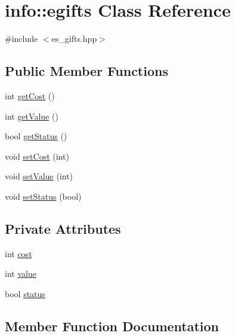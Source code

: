 \hypertarget{classinfo_1_1egifts}{}\section{info\+:\+:egifts Class Reference}
\label{classinfo_1_1egifts}


{\ttfamily \#include $<$es\+\_\+gifts.\+hpp$>$}

\subsection*{Public Member Functions}
\begin{DoxyCompactItemize}
\item 
int \hyperlink{classinfo_1_1egifts_a7f9d71b56a47b03952cf029cdc623296}{get\+Cost} ()
\item 
int \hyperlink{classinfo_1_1egifts_a3e9a4718f08ee328a6792895b3617366}{get\+Value} ()
\item 
bool \hyperlink{classinfo_1_1egifts_ad890793e5630b1f267aaf3e3ff78b0e3}{get\+Status} ()
\item 
void \hyperlink{classinfo_1_1egifts_a516d5d969afa4815ee5cf54aa46e6ba7}{set\+Cost} (int)
\item 
void \hyperlink{classinfo_1_1egifts_a7cd21e71685d65b50df0393dd5d6c4cb}{set\+Value} (int)
\item 
void \hyperlink{classinfo_1_1egifts_a5e9efe68c2fd27638b06f5b238107bf0}{set\+Status} (bool)
\end{DoxyCompactItemize}
\subsection*{Private Attributes}
\begin{DoxyCompactItemize}
\item 
int \hyperlink{classinfo_1_1egifts_aa6f498995992d599f68c86c76f6f3b15}{cost}
\item 
int \hyperlink{classinfo_1_1egifts_a4bbef1ffe342b5a5ee91586f758d55fd}{value}
\item 
bool \hyperlink{classinfo_1_1egifts_ac558a1c998f5f3a48332c3ce0f899487}{status}
\end{DoxyCompactItemize}


\subsection{Member Function Documentation}
\mbox{\label{classinfo_1_1egifts_a7f9d71b56a47b03952cf029cdc623296}} 
